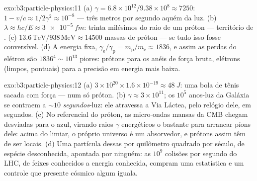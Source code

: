 \begin{solution}{exo:b3:particle-physics:11}
(a) $\gamma = 6.8\times10^{12}/9.38\times10^{8} \approx 7250$:
$1 - v/c \approx 1/2\gamma^2 \approx 10^{-8}$ --- três metros
por segundo aquém da luz. (b) $\lambda \approx hc/E \approx
\qty{3e-5}{fm}$: trinta milésimos do raio de um próton --- território
de . (c) $13.6\,\text{TeV}/938\,\text{MeV} \approx
14500$ massas de próton --- se tudo isso fosse conversível. (d) A
energia fixa, $\gamma_{\text{e}}/\gamma_{\text{p}} =
m_{\text{p}}/m_{\text{e}} \approx 1836$, e assim as perdas do elétron são
$1836^4 \sim 10^{13}$ piores: prótons para os anéis de força bruta,
elétrons (limpos, pontuais) para a precisão em energia mais baixa.
\end{solution}

\begin{solution}{exo:b3:particle-physics:12}
(a) $3\times10^{20}\times1.6\times10^{-19} \approx \qty{48}{J}$:
uma bola de tênis sacada com força --- num só próton. (b) $\gamma \approx
3\times10^{11}$; os $10^{5}$ anos-luz da Galáxia se contraem a
${\sim}10$ \emph{segundos}-luz: ele atravessa a Via Láctea, pelo
relógio dele, em segundos. (c) No referencial do próton, as
micro-ondas mansas da CMB chegam desviadas para o azul, virando raios
$\gamma$ energéticos o bastante para arrancar píons dele: acima do
limiar, o próprio universo é um absorvedor, e prótons assim têm de ser
locais. (d) Uma partícula dessas por quilômetro quadrado por século, de
espécie desconhecida, apontada por ninguém: as $10^{9}$ colisões por
segundo do LHC, de feixes conhecidos a energia conhecida, compram uma
estatística e um controle que presente cósmico algum iguala.
\end{solution}

